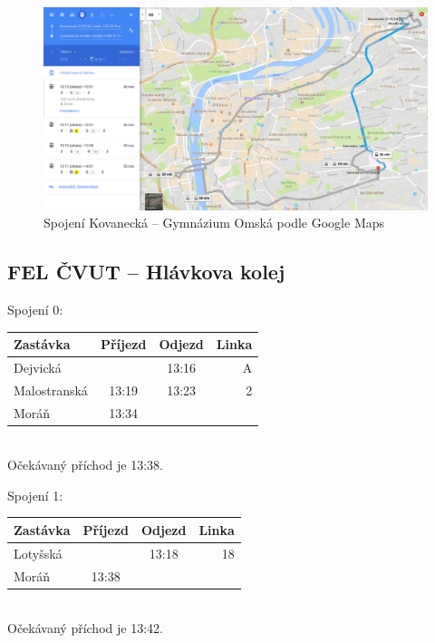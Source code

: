 \begin{figure}[h]
  \centering
    \includegraphics[width=\textwidth]{../img/kovanecka-omska-google.png}
  \caption{Spojení Kovanecká -- Gymnázium Omská podle Google Maps}
  \label{fig:kovanecka-omska-google}
\end{figure}

\clearpage
\subsection{FEL ČVUT -- Hlávkova kolej}
Spojení 0:\\[2mm]
\begin{tabular}{|l|c|c|r|}\hline
{\bf Zastávka}&{\bf Příjezd}&{\bf Odjezd}&{\bf Linka}\\\hline
Dejvická&&13:16&A\\\hline
Malostranská&13:19&13:23&2\\\hline
Moráň&13:34&&\\\hline
\end{tabular}\\[2mm]
Očekávaný příchod je 13:38.

Spojení 1:\\[2mm]
\begin{tabular}{|l|c|c|r|}\hline
{\bf Zastávka}&{\bf Příjezd}&{\bf Odjezd}&{\bf Linka}\\\hline
Lotyšská&&13:18&18\\\hline
Moráň&13:38&&\\\hline
\end{tabular}\\[2mm]
Očekávaný příchod je 13:42.


